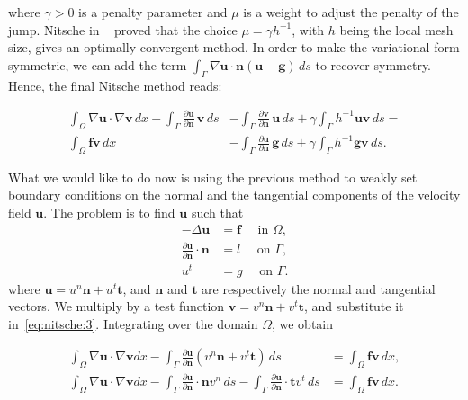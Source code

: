 \documentclass[11pt,a4paper,titlepage]{report}
\begin{document}
where $\gamma > 0$ is a penalty parameter and $\mu$ is a weight to adjust the penalty of the jump. Nitsche in ~\cite{Nitsche1977} proved that the choice $\mu = \gamma h^{-1}$, with $h$ being the local mesh size, gives an optimally convergent method. In order to make the variational form symmetric, we can add the term $\int_{\Gamma} \nabla \mathbf{u} \cdot \mathbf{n} (\mathbf{u}-\mathbf{g}) \, ds$ to recover symmetry. Hence, the final Nitsche method reads:

\begin{align}
\int_{\Omega} \nabla \mathbf{u} \cdot \nabla \mathbf{v} \, dx
- \int_{\Gamma} \frac{\partial \mathbf{u}}{\partial \mathbf{n}} \, \mathbf{v} \, ds
& - \int_{\Gamma} \frac{\partial \mathbf{v}}{\partial \mathbf{n}}\, \mathbf{u} \, ds 
+ \gamma \int_{\Gamma} h^{-1} \mathbf{u} \mathbf{v} \, ds = \\
	\int_{\Omega} \mathbf{f} \mathbf{v} \, dx
&- \int_{\Gamma} \frac{\partial \mathbf{u}}{\partial \mathbf{n}} \, \mathbf{g} \, ds
+ \gamma \int_{\Gamma} h^{-1} \mathbf{g} \mathbf{v} \, ds.
\end{align}

What we would like to do now is using the previous method to weakly set boundary conditions on the normal and the tangential components of the velocity field $\mathbf{u}$. The problem is to find $\mathbf{u}$ such that
\begin{align}
- \Delta \mathbf{u} &= \mathbf{f} \quad \text{ in } \Omega, \\
\label{eq:nitsche:4}
\frac{\partial \mathbf{u}}{\partial \mathbf{n}} \cdot \mathbf{n} &= l \quad \text{ on } \Gamma, \\ 
u^t &= g \quad \text{ on } \Gamma.
\end{align}
where $\mathbf{u} = u^n \mathbf{n} + u^t \mathbf{t}$, and $\mathbf{n}$ and $\mathbf{t}$ are respectively the normal and tangential vectors. We multiply by a test function $\mathbf{v} = v^n \mathbf{n} + v^t \mathbf{t}$, and substitute it in~\eqref{eq:nitsche:3}. Integrating over the domain $\Omega$, we obtain

\begin{align}
\int_\Omega \nabla \mathbf{u} \cdot \nabla \mathbf{v} dx
- \int_{\Gamma} \frac{\partial \mathbf{u}}{\partial \mathbf{n}} (v^n \mathbf{n} + v^t \mathbf{t} ) \, ds
& = \int_\Omega \mathbf{fv} \, dx, \\
\int_\Omega \nabla \mathbf{u} \cdot \nabla \mathbf{v} dx
- \int_{\Gamma} \frac{\partial \mathbf{u}}{\partial \mathbf{n}} \cdot \mathbf{n} v^n \, ds
- \int_{\Gamma} \frac{\partial \mathbf{u}}{\partial \mathbf{n}} \cdot \mathbf{t} v^t \, ds
& = \int_\Omega \mathbf{fv} \, dx.
\end{align}
\end{document}
